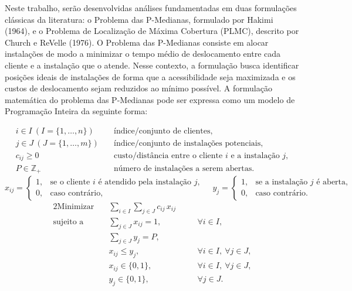 \documentclass[12pt]{article}
\begin{document}
Neste trabalho, serão desenvolvidas análises fundamentadas em duas formulações clássicas da literatura: o Problema das P-Medianas, formulado por Hakimi (1964), e o Problema de Localização de Máxima Cobertura (PLMC), descrito por Church e ReVelle (1976). O Problema das P-Medianas consiste em alocar instalações de modo a minimizar o tempo médio de deslocamento entre cada cliente e a instalação que o atende. Nesse contexto, a formulação busca identificar posições ideais de instalações de forma que a acessibilidade seja maximizada e os custos de deslocamento sejam reduzidos ao mínimo possível. A formulação matemática do problema das P-Medianas pode ser expressa como um modelo de Programação Inteira da seguinte forma:

\[
\begin{aligned}
i \in I\ (I=\{1,\ldots,n\}) &\quad \text{índice/conjunto de clientes},\\
j \in J\ (J=\{1,\ldots,m\}) &\quad \text{índice/conjunto de instalações potenciais},\\
c_{ij} \ge 0 &\quad \text{custo/distância entre o cliente $i$ e a instalação $j$},\\
P \in \mathbb{Z}_{+} &\quad \text{número de instalações a serem abertas}.
\end{aligned}
\]
\[
x_{ij} =
\begin{cases}
1, & \text{se o cliente $i$ é atendido pela instalação $j$},\\
0, & \text{caso contrário},
\end{cases}
\quad
y_{j} =
\begin{cases}
1, & \text{se a instalação $j$ é aberta},\\
0, & \text{caso contrário}.
\end{cases}
\]
\begin{alignat*}{2}
\text{Minimizar}\quad 
& \sum_{i \in I}\sum_{j \in J} c_{ij}\,x_{ij} \\
\text{sujeito a}\quad
& \sum_{j \in J} x_{ij} = 1,                 && \quad \forall i \in I, \\
& \sum_{j \in J} y_{j} = P,                  && \\
& x_{ij} \le y_{j},                          && \quad \forall i \in I,\ \forall j \in J, \\
& x_{ij} \in \{0,1\},                        && \quad \forall i \in I,\ \forall j \in J, \\
& y_{j} \in \{0,1\},                         && \quad \forall j \in J.
\end{alignat*}
\end{document}
